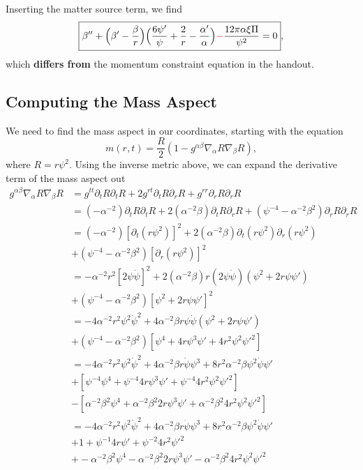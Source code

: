 \documentclass[12pt]{article}
\numberwithin{equation}{section}
\newcommand{\redtext}[1]{\textcolor{red}{#1}}
\begin{document}
Inserting the matter source term, we find
\begin{equation}
\boxed{\beta'' + \Big( \beta' - \frac{\beta}{r} \Big) \Big( \frac{6 \psi'}{\psi} + \frac{2}{r} - \frac{\alpha'}{\alpha} \Big) \redtext{-} \frac{12 \pi \alpha \xi \Pi}{\psi^2} = 0},
\end{equation}
which \textbf{differs from} the momentum constraint equation in the handout.

\subsection{Computing the Mass Aspect}
We need to find the mass aspect in our coordinates, starting with the equation
\begin{equation}
m(r, t) = \frac{R}{2} (1 - g^{\alpha \beta} \nabla_\alpha R \nabla_\beta R),
\end{equation}
where $R = r \psi^2$.  Using the inverse metric above, we can expand the derivative term of the mass aspect out
\begin{equation}
\begin{aligned}
g^{\alpha \beta} \nabla_\alpha R \nabla_\beta R &= g^{tt} \partial_t R \partial_t R + 2 g^{rt} \partial_t R \partial_r R + g^{rr} \partial_r R \partial_r R \\
&= (-\alpha^{-2}) \partial_t R \partial_t R + 2 (\alpha^{-2} \beta) \partial_t R \partial_r R + (\psi^{-4} - \alpha^{-2} \beta^2) \partial_r R \partial_r R \\
&= (-\alpha^{-2}) [\partial_t (r \psi^2)]^2 + 2 (\alpha^{-2} \beta) \partial_t (r \psi^2) \partial_r (r \psi^2) \\
&+ (\psi^{-4} - \alpha^{-2} \beta^2) [\partial_r (r \psi^2)]^2 \\
&= -\alpha^{-2} r^2 [2 \psi \dot{\psi}]^2 + 2 (\alpha^{-2} \beta) r (2 \psi \dot{\psi}) (\psi^2 + 2 r \psi \psi') \\
&+ (\psi^{-4} - \alpha^{-2} \beta^2) [\psi^2 + 2 r \psi \psi']^2 \\
&= -4 \alpha^{-2} r^2 \psi^2 \dot{\psi}^2 + 4 \alpha^{-2} \beta r \psi \dot{\psi} (\psi^2 + 2 r \psi \psi') \\
&+ (\psi^{-4} - \alpha^{-2} \beta^2) [\psi^4 + 4 r \psi^3 \psi' + 4 r^2 \psi^2 \psi'^2] \\
&= -4 \alpha^{-2} r^2 \psi^2 \dot{\psi}^2 + 4 \alpha^{-2} \beta r \dot{\psi} \psi^3 + 8 r^2 \alpha^{-2} \beta \psi^2 \dot{\psi} \psi' \\
&+ [\psi^{-4} \psi^4 + \psi^{-4} 4 r \psi^3 \psi' + \psi^{-4} 4 r^2 \psi^2 \psi'^2] \\
&- [\alpha^{-2} \beta^2 \psi^4 + \alpha^{-2} \beta^2 2 r \psi^3 \psi' + \alpha^{-2} \beta^2 4 r^2 \psi^2 \psi'^2] \\
&= -4 \alpha^{-2} r^2 \psi^2 \dot{\psi}^2 + 4 \alpha^{-2} \beta r \dot{\psi} \psi^3 + 8 r^2 \alpha^{-2} \beta \psi^2 \dot{\psi} \psi' \\
&+ 1 + \psi^{-1} 4 r \psi' + \psi^{-2} 4 r^2 \psi'^2 \\
&+ -\alpha^{-2} \beta^2 \psi^4 - \alpha^{-2} \beta^2 2 r \psi^3 \psi' - \alpha^{-2} \beta^2 4 r^2 \psi^2 \psi'^2 \\
\end{aligned}
\end{equation}
\end{document}
